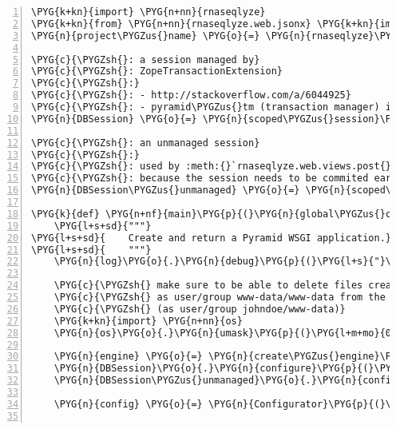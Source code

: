 \begin{Verbatim}[commandchars=\\\{\},numbers=left,firstnumber=1,stepnumber=5]
\PYG{k+kn}{import} \PYG{n+nn}{rnaseqlyze}
\PYG{k+kn}{from} \PYG{n+nn}{rnaseqlyze.web.jsonx} \PYG{k+kn}{import} \PYG{n}{jsonx}
\PYG{n}{project\PYGZus{}name} \PYG{o}{=} \PYG{n}{rnaseqlyze}\PYG{o}{.}\PYG{n}{project\PYGZus{}name} \PYG{o}{+} \PYG{l+s}{"}\PYG{l+s}{-web}\PYG{l+s}{"}

\PYG{c}{\PYGZsh{}: a session managed by}
\PYG{c}{\PYGZsh{}: ZopeTransactionExtension}
\PYG{c}{\PYGZsh{}:}
\PYG{c}{\PYGZsh{}: - http://stackoverflow.com/a/6044925}
\PYG{c}{\PYGZsh{}: - pyramid\PYGZus{}tm (transaction manager) is configured}
\PYG{n}{DBSession} \PYG{o}{=} \PYG{n}{scoped\PYGZus{}session}\PYG{p}{(}\PYG{n}{sessionmaker}\PYG{p}{(}\PYG{n}{extension}\PYG{o}{=}\PYG{n}{ZopeTransactionExtension}\PYG{p}{(}\PYG{p}{)}\PYG{p}{)}\PYG{p}{)}

\PYG{c}{\PYGZsh{}: an unmanaged session}
\PYG{c}{\PYGZsh{}:}
\PYG{c}{\PYGZsh{}: used by :meth:{}`rnaseqlyze.web.views.post{}`}
\PYG{c}{\PYGZsh{}: because the session needs to be commited early there}
\PYG{n}{DBSession\PYGZus{}unmanaged} \PYG{o}{=} \PYG{n}{scoped\PYGZus{}session}\PYG{p}{(}\PYG{n}{sessionmaker}\PYG{p}{(}\PYG{p}{)}\PYG{p}{)}

\PYG{k}{def} \PYG{n+nf}{main}\PYG{p}{(}\PYG{n}{global\PYGZus{}config}\PYG{p}{,} \PYG{o}{*}\PYG{o}{*}\PYG{n}{settings}\PYG{p}{)}\PYG{p}{:}
    \PYG{l+s+sd}{"""}
\PYG{l+s+sd}{    Create and return a Pyramid WSGI application.}
\PYG{l+s+sd}{    """}
    \PYG{n}{log}\PYG{o}{.}\PYG{n}{debug}\PYG{p}{(}\PYG{l+s}{"}\PYG{l+s}{rnaseqlyze.web version }\PYG{l+s+si}{\PYGZpc{}s}\PYG{l+s}{ : main()}\PYG{l+s}{"} \PYG{o}{\PYGZpc{}} \PYG{n}{rnaseqlyze}\PYG{o}{.}\PYG{n}{\PYGZus{}\PYGZus{}version\PYGZus{}\PYGZus{}}\PYG{p}{)}

    \PYG{c}{\PYGZsh{} make sure to be able to delete files created by webapp}
    \PYG{c}{\PYGZsh{} as user/group www-data/www-data from the command line}
    \PYG{c}{\PYGZsh{} (as user/group johndoe/www-data)}
    \PYG{k+kn}{import} \PYG{n+nn}{os}
    \PYG{n}{os}\PYG{o}{.}\PYG{n}{umask}\PYG{p}{(}\PYG{l+m+mo}{0002}\PYG{p}{)}

    \PYG{n}{engine} \PYG{o}{=} \PYG{n}{create\PYGZus{}engine}\PYG{p}{(}\PYG{n}{rnaseqlyze}\PYG{o}{.}\PYG{n}{db\PYGZus{}url}\PYG{p}{)}
    \PYG{n}{DBSession}\PYG{o}{.}\PYG{n}{configure}\PYG{p}{(}\PYG{n}{bind}\PYG{o}{=}\PYG{n}{engine}\PYG{p}{)}
    \PYG{n}{DBSession\PYGZus{}unmanaged}\PYG{o}{.}\PYG{n}{configure}\PYG{p}{(}\PYG{n}{bind}\PYG{o}{=}\PYG{n}{engine}\PYG{p}{)}

    \PYG{n}{config} \PYG{o}{=} \PYG{n}{Configurator}\PYG{p}{(}\PYG{n}{settings}\PYG{o}{=}\PYG{n}{settings}\PYG{p}{)}


\end{Verbatim}
